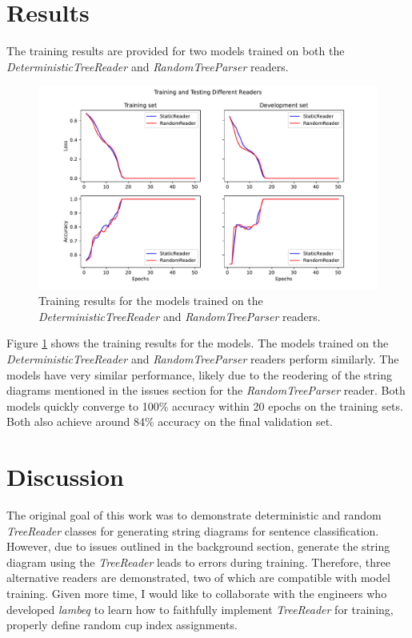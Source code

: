 \documentclass[12pt ]{article}
\begin{document}
\section{Results}

 The training results are provided for two models trained on both the {\it DeterministicTreeReader} and {\it RandomTreeParser} readers.

\begin{figure}[t!]
  \centering
\includegraphics[width=\textwidth]{../test/output/figure.pdf}
  \caption{Training results for the models trained on the {\it DeterministicTreeReader} and {\it RandomTreeParser} readers.}
  \label{fig:results}

\end{figure}

Figure \ref{fig:results} shows the training results for the models. The models trained on the {\it DeterministicTreeReader} and {\it RandomTreeParser} readers perform similarly. The models have very similar performance, likely due to the reodering of the string diagrams mentioned in the issues section for the {\it RandomTreeParser} reader. Both models quickly converge to 100\% accuracy within 20 epochs on the training sets. Both also achieve around 84\% accuracy on the final validation set.


\section{Discussion}
The original goal of this work was to demonstrate deterministic and random {\it TreeReader } classes for generating string diagrams for sentence classification. However, due to issues outlined in the background section, generate the string diagram using the {\it TreeReader} leads to errors during training. Therefore, three alternative readers are demonstrated, two of which are compatible with model training. Given more time, I would like to collaborate with the engineers who developed {\it lambeq} to learn how to faithfully implement {\it TreeReader} for training, properly define random cup index assignments. 
\end{document}
